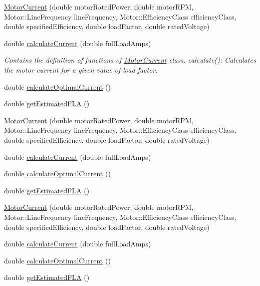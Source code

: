 \begin{DoxyCompactItemize}
\item 
\hyperlink{class_motor_current_a9b6c25ee190196044e229b34a03d2af1}{Motor\+Current} (double motor\+Rated\+Power, double motor\+R\+PM, Motor\+::\+Line\+Frequency line\+Frequency, Motor\+::\+Efficiency\+Class efficiency\+Class, double specified\+Efficiency, double load\+Factor, double rated\+Voltage)
\item 
double \hyperlink{class_motor_current_aa08b2f8ba065b24908c7e1b80cadb4f6}{calculate\+Current} (double full\+Load\+Amps)
\begin{DoxyCompactList}\small\item\em Contains the definition of functions of \hyperlink{class_motor_current}{Motor\+Current} class. calculate()\+: Calculates the motor current for a given value of load factor. \end{DoxyCompactList}\item 
double \hyperlink{class_motor_current_a40638a00e4d21b34c74f8406f4e70046}{calculate\+Optimal\+Current} ()
\item 
double \hyperlink{class_motor_current_a0f845ec03585b21a8e476ed3e63f365f}{get\+Estimated\+F\+LA} ()
\item 
\hyperlink{class_motor_current_a9b6c25ee190196044e229b34a03d2af1}{Motor\+Current} (double motor\+Rated\+Power, double motor\+R\+PM, Motor\+::\+Line\+Frequency line\+Frequency, Motor\+::\+Efficiency\+Class efficiency\+Class, double specified\+Efficiency, double load\+Factor, double rated\+Voltage)
\item 
double \hyperlink{class_motor_current_aa08b2f8ba065b24908c7e1b80cadb4f6}{calculate\+Current} (double full\+Load\+Amps)
\item 
double \hyperlink{class_motor_current_a40638a00e4d21b34c74f8406f4e70046}{calculate\+Optimal\+Current} ()
\item 
double \hyperlink{class_motor_current_a0f845ec03585b21a8e476ed3e63f365f}{get\+Estimated\+F\+LA} ()
\item 
\hyperlink{class_motor_current_a9b6c25ee190196044e229b34a03d2af1}{Motor\+Current} (double motor\+Rated\+Power, double motor\+R\+PM, Motor\+::\+Line\+Frequency line\+Frequency, Motor\+::\+Efficiency\+Class efficiency\+Class, double specified\+Efficiency, double load\+Factor, double rated\+Voltage)
\item 
double \hyperlink{class_motor_current_aa08b2f8ba065b24908c7e1b80cadb4f6}{calculate\+Current} (double full\+Load\+Amps)
\item 
double \hyperlink{class_motor_current_a40638a00e4d21b34c74f8406f4e70046}{calculate\+Optimal\+Current} ()
\item 
double \hyperlink{class_motor_current_a0f845ec03585b21a8e476ed3e63f365f}{get\+Estimated\+F\+LA} ()
\end{DoxyCompactItemize}


